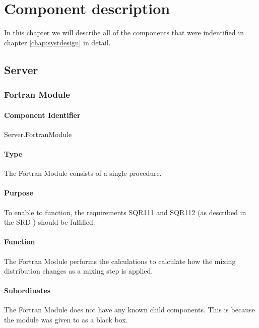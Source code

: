 \chapter{Component description}
\label{chap:compdescr}
In this chapter we will describe all of the components that were indentified in chapter \ref{chap:systdesign} in detail.

\section{Server}

\subsection{Fortran Module}

\subsubsection*{Component Identifier}
Server.FortranModule

\subsubsection*{Type}
The Fortran Module consists of a single procedure.

\subsubsection*{Purpose}
To enable \projectname to function, the requirements SQR111 and SQR112 (as described in the SRD \cite{srd}) should be fulfilled.

\subsubsection*{Function}
The Fortran Module performs the calculations to calculate how the mixing distribution changes as a mixing step is applied.

\subsubsection*{Subordinates}
The Fortran Module does not have any known child components. This is because the module was given to \projectauthor as a black box.

